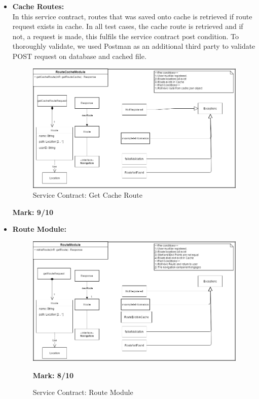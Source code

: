 \begin{itemize}
\newpage	
\item \textbf{Cache Routes:}\\In this service contract, routes that was saved onto cache is retrieved if route request exists in cache. In all test cases, the cache route is retrieved and if not, a request is made, this fulfils the service contract post condition. To thoroughly validate, we used Postman as an additional third party to validate POST request on database and cached file.\\
\begin{figure}[H]
\includegraphics[scale=0.5]{service_contracts/CacheRoute.png}
\caption{Service Contract: Get Cache Route}
\end{figure}
	\textbf{Mark: 9/10}
	
\newpage
\item \textbf{Route Module:}\\
\begin{figure}[H]
\includegraphics[scale=0.5]{service_contracts/retrieveRoute.png}
\caption{Service Contract: Route Module}
	\textbf{Mark: 8/10}
\end{figure}


\end{itemize}

